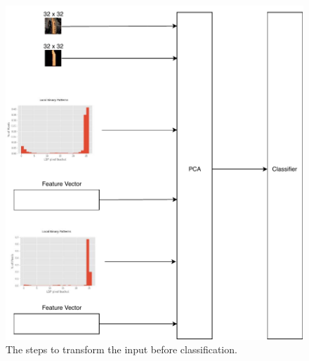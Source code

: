 \begin{figure}[tp]
	\centerline{\includegraphics[scale=0.5]{./img/pca.pdf}}
	\caption{The steps to transform the input before classification.}
	\label{fig:pca}
\end{figure}